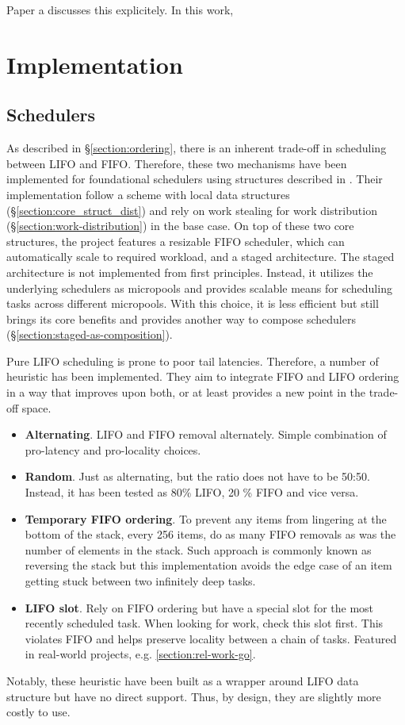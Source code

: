 \documentclass[12pt,a4paper,twoside]{report}
\begin{document}
Paper a discusses this explicitely. In this work,



\chapter{Implementation}

\section{Schedulers}
\label{section:impl-schedulers}
As described in \S\ref{section:ordering}, there is an inherent trade-off in scheduling between LIFO and FIFO. Therefore, these two mechanisms have been implemented for foundational schedulers using structures described in . Their implementation follow a scheme with local data structures (\S\ref{section:core_struct_dist}) and rely on work stealing for work distribution (\S\ref{section:work-distribution}) in the base case. On top of these two core structures, the project features a resizable FIFO scheduler, which can automatically scale to required workload, and a staged architecture. The staged architecture is not implemented from first principles. Instead, it utilizes the underlying schedulers as micropools and provides scalable means for scheduling tasks across different micropools. With this choice, it is less efficient but still brings its core benefits and provides another way to compose schedulers (\S\ref{section:staged-as-composition}).

\label{paragraph:lifo-heuristics}
Pure LIFO scheduling is prone to poor tail latencies. Therefore, a number of heuristic has been implemented. They aim to integrate FIFO and LIFO ordering in a way that improves upon both, or at least provides a new point in the trade-off space.
\begin{itemize}
    \item \textbf{Alternating}. LIFO and FIFO removal alternately. Simple combination of pro-latency and pro-locality choices. 
    \item \textbf{Random}. Just as alternating, but the ratio does not have to be 50:50. Instead, it has been tested as 80\% LIFO, 20 \% FIFO and vice versa.  
    \item \textbf{Temporary FIFO ordering}. To prevent any items from lingering at the bottom of the stack, every 256 items, do as many FIFO removals as was the number of elements in the stack. Such approach is commonly known as reversing the stack but this implementation avoids the edge case of an item getting stuck between two infinitely deep tasks.
    \item \textbf{LIFO slot}. Rely on FIFO ordering but have a special slot for the most recently scheduled task. When looking for work, check this slot first. This violates FIFO and helps preserve locality between a chain of tasks. Featured in real-world projects, e.g. \ref{section:rel-work-go}. 
\end{itemize}
Notably, these heuristic have been built as a wrapper around LIFO data structure but have no direct support. Thus, by design, they are slightly more costly to use. 
\end{document}
